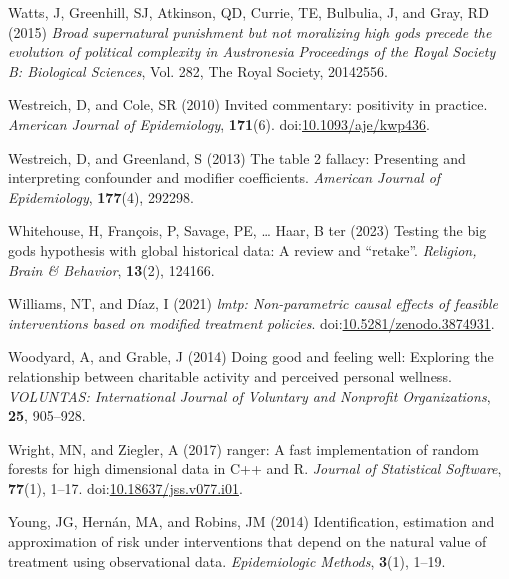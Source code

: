 \documentclass[
  single column]{article}
\newlength{\cslhangindent}
\newenvironment{CSLReferences}[2] %
 {\begin{list}{}{%
  \setlength{\itemindent}{0pt}
  \setlength{\leftmargin}{0pt}
  \setlength{\parsep}{0pt}
  \ifodd #1
   \setlength{\leftmargin}{\cslhangindent}
   \setlength{\itemindent}{-1\cslhangindent}
  \fi
  \setlength{\itemsep}{#2\baselineskip}}}
 {\end{list}}
\begin{document}
\begin{CSLReferences}{1}{0}
Watts, J, Greenhill, SJ, Atkinson, QD, Currie, TE, Bulbulia, J, and
Gray, RD (2015) \emph{Broad supernatural punishment but not moralizing
high gods precede the evolution of political complexity in
{A}ustronesia} \emph{Proceedings of the Royal Society B: Biological
Sciences}, Vol. 282, The Royal Society, 20142556.

Westreich, D, and Cole, SR (2010) Invited commentary: positivity in
practice. \emph{American Journal of Epidemiology}, \textbf{171}(6).
doi:\href{https://doi.org/10.1093/aje/kwp436}{10.1093/aje/kwp436}.

Westreich, D, and Greenland, S (2013) The table 2 fallacy: Presenting
and interpreting confounder and modifier coefficients. \emph{American
Journal of Epidemiology}, \textbf{177}(4), 292298.

Whitehouse, H, François, P, Savage, PE, \ldots{} Haar, B ter (2023)
Testing the big gods hypothesis with global historical data: A review
and {``}retake{''}. \emph{Religion, Brain \& Behavior}, \textbf{13}(2),
124166.

Williams, NT, and Díaz, I (2021) \emph{{l}mtp: Non-parametric causal
effects of feasible interventions based on modified treatment policies}.
doi:\href{https://doi.org/10.5281/zenodo.3874931}{10.5281/zenodo.3874931}.

Woodyard, A, and Grable, J (2014) Doing good and feeling well: Exploring
the relationship between charitable activity and perceived personal
wellness. \emph{VOLUNTAS: International Journal of Voluntary and
Nonprofit Organizations}, \textbf{25}, 905--928.

Wright, MN, and Ziegler, A (2017) {ranger}: A fast implementation of
random forests for high dimensional data in {C++} and {R}. \emph{Journal
of Statistical Software}, \textbf{77}(1), 1--17.
doi:\href{https://doi.org/10.18637/jss.v077.i01}{10.18637/jss.v077.i01}.

Young, JG, Hernán, MA, and Robins, JM (2014) Identification, estimation
and approximation of risk under interventions that depend on the natural
value of treatment using observational data. \emph{Epidemiologic
Methods}, \textbf{3}(1), 1--19.

\end{CSLReferences}
\end{document}
